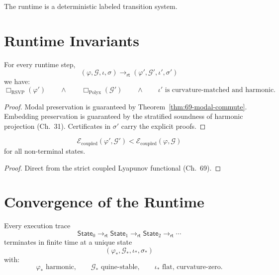 \begin{corollary}[Determinism]
The runtime is a deterministic labeled transition system.
\end{corollary}

\section{Runtime Invariants}

\begin{theorem}
For every runtime step,
\[
(\varphi,\mathcal{G},\iota,\sigma)
    \longrightarrow_{\mathsf{rt}}
(\varphi',\mathcal{G}',\iota',\sigma')
\]
we have:
\[
\Box_{\mathrm{RSVP}}(\varphi')
\qquad\wedge\qquad
\Box_{\mathrm{Polyx}}(\mathcal{G}')
\qquad\wedge\qquad
\iota' \text{ is curvature-matched and harmonic.}
\]
\end{theorem}

\begin{proof}
Modal preservation is guaranteed by Theorem~\ref{thm:69-modal-commute}.  
Embedding preservation is guaranteed by the stratified soundness of harmonic 
projection (Ch.~31).  
Certificates in $\sigma'$ carry the explicit proofs.
\end{proof}

\begin{theorem}
\[
\mathcal{E}_{\mathrm{coupled}}(\varphi',\mathcal{G}')
  <
\mathcal{E}_{\mathrm{coupled}}(\varphi,\mathcal{G})
\]
for all non-terminal states.
\end{theorem}

\begin{proof}
Direct from the strict coupled Lyapunov functional 
(Ch.~69).
\end{proof}

\section{Convergence of the Runtime}

\begin{theorem}
Every execution trace
\[
\mathsf{State}_0
  \longrightarrow_{\mathsf{rt}}
  \mathsf{State}_1
  \longrightarrow_{\mathsf{rt}}
  \mathsf{State}_2
  \longrightarrow_{\mathsf{rt}}
  \cdots
\]
terminates in finite time at a unique state
\[
(\varphi_\ast,\mathcal{G}_\ast,\iota_\ast,\sigma_\ast)
\]
with:
\[
\varphi_\ast \text{ harmonic}, \qquad
\mathcal{G}_\ast \text{ quine-stable}, \qquad
\iota_\ast \text{ flat, curvature-zero}.
\]
\end{theorem}

